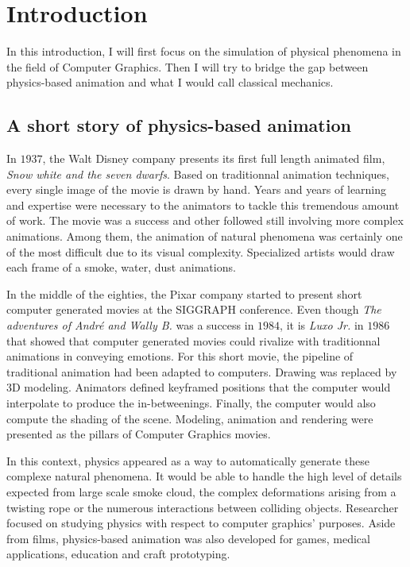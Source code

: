 \chapter{Introduction}
\label{chap:introdution}

In this introduction, I will first focus on the simulation of physical phenomena in the field of Computer Graphics. Then I will try to bridge the gap between physics-based animation and what I would call classical mechanics.

\section{A short story of physics-based animation}

In $1937$, the Walt Disney company presents its first full length animated film, \emph{Snow white and the seven dwarfs}. Based on traditionnal animation techniques, every single image of the movie is drawn by hand. Years and years of learning and expertise were necessary to the animators to tackle this tremendous amount of work. The movie was a success and other followed still involving more complex animations. Among them, the animation of natural phenomena was certainly one of the most difficult due to its visual complexity. Specialized artists would draw each frame of a smoke, water, dust animations.

In the middle of the eighties, the Pixar company started to present short computer generated movies at the SIGGRAPH conference. Even though \emph{The adventures of André and Wally B.} was a success in $1984$, it is \emph{Luxo Jr.} in $1986$ that showed that computer generated movies could rivalize with traditionnal animations in conveying emotions. For this short movie, the pipeline of traditional animation had been adapted to computers. Drawing was replaced by 3D modeling. Animators defined keyframed positions that the computer would interpolate to produce the in-betweenings. Finally, the computer would also compute the shading of the scene. Modeling, animation and rendering were presented as the pillars of Computer Graphics movies.

In this context, physics appeared as a way to automatically generate these complexe natural phenomena. It would be able to handle the high level of details expected from large scale smoke cloud, the complex deformations arising from a twisting rope or the numerous interactions between colliding objects. Researcher focused on studying physics with respect to computer graphics' purposes. Aside from films, physics-based animation was also developed for games, medical applications, education and craft prototyping.

